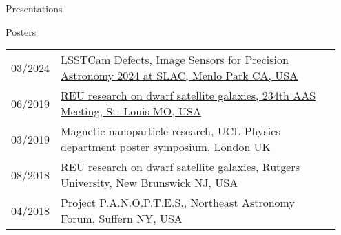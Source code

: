 \documentclass{resume} %
\begin{document}
\begin{rSection}{Presentations}
\begin{rSubsection}{Posters}{}{}{}
\begin{table}[h]
\begin{tabular}{p{0.07\linewidth} p{0.88\linewidth}}
03/2024 & \href{https://indico.slac.stanford.edu/event/8442/contributions/8626/}{LSSTCam Defects, Image Sensors for Precision Astronomy 2024 at SLAC, Menlo Park CA, USA}\\
06/2019 & \href{https://assets.pubpub.org/d14kkapv/41575915658488.pdf}{REU research on dwarf satellite galaxies, 234th AAS Meeting, St. Louis MO, USA}\\
03/2019 & Magnetic nanoparticle research, UCL Physics department poster symposium, London UK\\
08/2018 & REU research on dwarf satellite galaxies, Rutgers University, New Brunswick NJ, USA\\
04/2018 & Project P.A.N.O.P.T.E.S., Northeast Astronomy Forum, Suffern NY, USA\\
\end{tabular}
\end{table}
\end{rSubsection}

\end{rSection}
\end{document}

